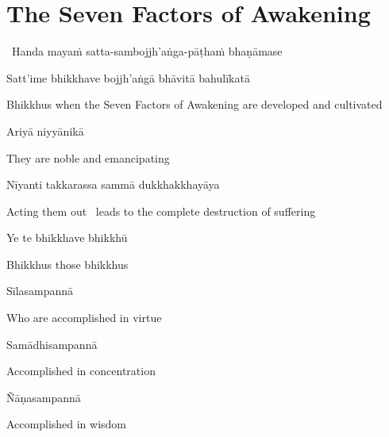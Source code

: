 \suttaRef{[DN 16]}


\section{The Seven Factors of Awakening}
\label{seven-factors-of-awakening}

\begin{leader}
  \anglebracketleft\ \hspace{-0.5mm}Handa mayaṁ satta-sambojjh'aṅga-pāṭhaṁ bhaṇāmase \hspace{-0.5mm}\anglebracketright\
\end{leader}

Satt'ime bhikkhave bojjh'aṅgā bhāvitā bahulīkatā

\begin{english-hang}
  Bhikkhus when the Seven Factors of Awakening are developed and cultivated
\end{english-hang}

Ariyā niyyānikā

\begin{english}
  They are noble and emancipating
\end{english}

Nīyanti takkarassa sammā dukkhakkhayāya

\begin{english}
  Acting them out \breathmark\ leads to the complete destruction of suffering
\end{english}

\suttaRef{[SN 46.19]}

Ye te bhikkhave bhikkhū

\begin{english}
  Bhikkhus those bhikkhus
\end{english}

Sīlasampannā

\begin{english}
  Who are accomplished in virtue
\end{english}

Samādhisampannā

\begin{english}
  Accomplished in concentration
\end{english}

Ñāṇasampannā

\begin{english}
  Accomplished in wisdom
\end{english}

